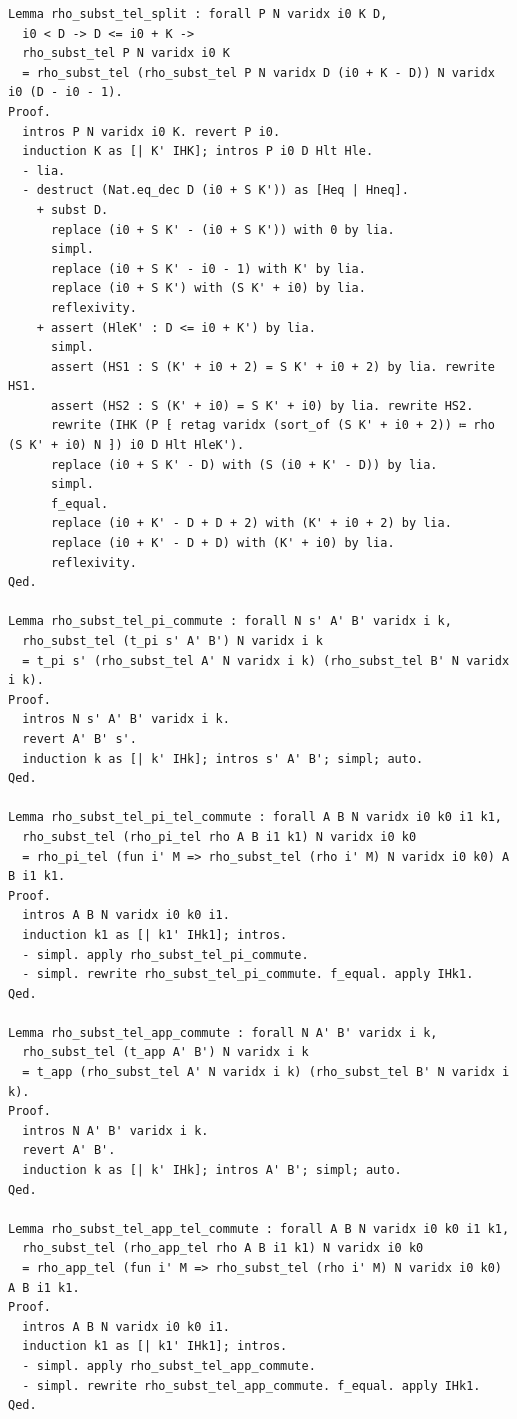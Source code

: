 \begin{latin}
\begin{verbatim}
Lemma rho_subst_tel_split : forall P N varidx i0 K D,
  i0 < D -> D <= i0 + K ->
  rho_subst_tel P N varidx i0 K
  = rho_subst_tel (rho_subst_tel P N varidx D (i0 + K - D)) N varidx i0 (D - i0 - 1).
Proof.
  intros P N varidx i0 K. revert P i0.
  induction K as [| K' IHK]; intros P i0 D Hlt Hle.
  - lia.
  - destruct (Nat.eq_dec D (i0 + S K')) as [Heq | Hneq].
    + subst D.
      replace (i0 + S K' - (i0 + S K')) with 0 by lia.
      simpl.
      replace (i0 + S K' - i0 - 1) with K' by lia.
      replace (i0 + S K') with (S K' + i0) by lia.
      reflexivity.
    + assert (HleK' : D <= i0 + K') by lia.
      simpl.
      assert (HS1 : S (K' + i0 + 2) = S K' + i0 + 2) by lia. rewrite HS1.
      assert (HS2 : S (K' + i0) = S K' + i0) by lia. rewrite HS2.
      rewrite (IHK (P ⁅ retag varidx (sort_of (S K' + i0 + 2)) ≔ rho (S K' + i0) N ⁆) i0 D Hlt HleK').
      replace (i0 + S K' - D) with (S (i0 + K' - D)) by lia.
      simpl.
      f_equal.
      replace (i0 + K' - D + D + 2) with (K' + i0 + 2) by lia.
      replace (i0 + K' - D + D) with (K' + i0) by lia.
      reflexivity.
Qed.

Lemma rho_subst_tel_pi_commute : forall N s' A' B' varidx i k,
  rho_subst_tel (t_pi s' A' B') N varidx i k
  = t_pi s' (rho_subst_tel A' N varidx i k) (rho_subst_tel B' N varidx i k).
Proof.
  intros N s' A' B' varidx i k.
  revert A' B' s'.
  induction k as [| k' IHk]; intros s' A' B'; simpl; auto.
Qed.

Lemma rho_subst_tel_pi_tel_commute : forall A B N varidx i0 k0 i1 k1,
  rho_subst_tel (rho_pi_tel rho A B i1 k1) N varidx i0 k0
  = rho_pi_tel (fun i' M => rho_subst_tel (rho i' M) N varidx i0 k0) A B i1 k1.
Proof.
  intros A B N varidx i0 k0 i1.
  induction k1 as [| k1' IHk1]; intros.
  - simpl. apply rho_subst_tel_pi_commute.
  - simpl. rewrite rho_subst_tel_pi_commute. f_equal. apply IHk1.
Qed.

Lemma rho_subst_tel_app_commute : forall N A' B' varidx i k,
  rho_subst_tel (t_app A' B') N varidx i k
  = t_app (rho_subst_tel A' N varidx i k) (rho_subst_tel B' N varidx i k).
Proof.
  intros N A' B' varidx i k.
  revert A' B'.
  induction k as [| k' IHk]; intros A' B'; simpl; auto.
Qed.

Lemma rho_subst_tel_app_tel_commute : forall A B N varidx i0 k0 i1 k1,
  rho_subst_tel (rho_app_tel rho A B i1 k1) N varidx i0 k0
  = rho_app_tel (fun i' M => rho_subst_tel (rho i' M) N varidx i0 k0) A B i1 k1.
Proof.
  intros A B N varidx i0 k0 i1.
  induction k1 as [| k1' IHk1]; intros.
  - simpl. apply rho_subst_tel_app_commute.
  - simpl. rewrite rho_subst_tel_app_commute. f_equal. apply IHk1.
Qed.


\end{verbatim}
\end{latin}
